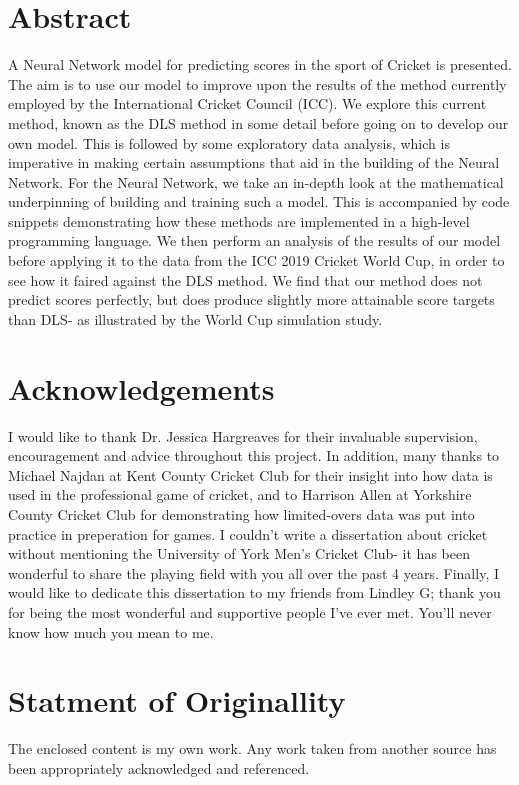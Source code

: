 \documentclass[11pt]{report}
\begin{document}


\section*{Abstract}
A Neural Network model for predicting scores in the sport of Cricket is presented. The aim is to use our model to improve upon the results of the method currently employed by 
the International Cricket Council (ICC). We explore this current method, known as the DLS method \cite{stern} in 
some detail before going on to develop our own model. This is followed by some exploratory data analysis, which is imperative in making certain assumptions that aid 
in the building of the Neural Network. For the Neural Network, we take an in-depth look at the mathematical underpinning of building and training such a model. This 
is accompanied by code snippets demonstrating how these methods are implemented in a high-level programming language. We then perform an analysis of the results 
of our model before applying it to the data from the ICC 2019 Cricket World Cup, in order to see how it faired against the DLS method. 
We find that our method does not predict scores perfectly, but does produce slightly more attainable score targets than DLS- as illustrated by the World Cup simulation 
study. 

\section*{Acknowledgements}
I would like to thank Dr. Jessica Hargreaves for their invaluable supervision, encouragement and advice throughout this project. In addition,
many thanks to Michael Najdan at Kent County Cricket Club for their insight into how data is used in the professional game of cricket, and to Harrison Allen at Yorkshire County Cricket Club for demonstrating how limited-overs data was put into practice in preperation for games. 
I couldn't write a dissertation about cricket without mentioning the University of York Men's Cricket Club- it has been wonderful to share the playing field with you all over the past 4 years.
Finally, I would like to dedicate this dissertation to my friends from Lindley G; thank you for being the most wonderful and supportive people I've ever met. You'll never know how much you mean to me.

\section*{Statment of Originallity}
The enclosed content is my own work. Any work taken from another source has been appropriately acknowledged and referenced. 
\end{document}
